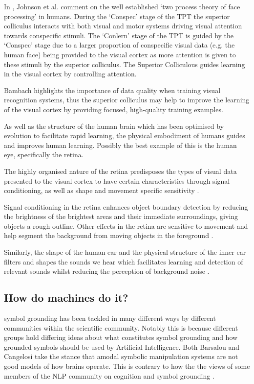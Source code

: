In \cite{johnson2015two}, Johnson et al. comment on the well established `two process theory of face processing' in humans.  During the `Conspec' stage of the \ac{TPT} the superior colliculus interacts with both visual and motor systems driving visual attention towards conspecific stimuli. The `Conlern' stage of the \ac{TPT} is guided by the `Conspec' stage due to a larger proportion of conspecific visual data  (e.g. the human face) being provided to the visual cortex as more attention is given to these stimuli by the superior colliculus. 
The Superior Colliculous guides learning in the visual cortex by controlling attention.

Bambach \cite{bambach2017egocentric} highlights the importance of data quality when training visual recognition systems, thus the superior colliculus may help to improve the learning of the visual cortex by providing focused, high-quality training examples.

As well as the structure of the human brain which has been optimised by evolution to facilitate rapid learning, the physical embodiment of humans guides and improves human learning. Possibly the best example of this is the human eye, specifically the retina.

The highly organised nature of the retina predisposes the types of visual data presented to the visual cortex to have certain characteristics through signal conditioning, as well as shape and movement specific sensitivity \cite{masland2012neuronal}.

Signal conditioning in the retina enhances object boundary detection by reducing the brightness of the brightest areas and their immediate surroundings, giving objects a rough outline. Other effects in the retina are sensitive to movement and help segment the background from moving objects in the foreground \cite{olveczky2003segregation}.

Similarly, the shape of the human ear and the physical structure of the inner ear filters and shapes the sounds we hear which facilitates learning and detection of relevant sounds whilst reducing the perception of background noise \cite{oxenham2018we}.

\subsection{How do machines do it?}
symbol grounding has been tackled in many different ways by different communities within the scientific community. Notably this is because different groups hold differing ideas about what constitutes symbol grounding and how grounded symbols should be used by Artificial Intelligence. Both Barsalou \cite{barsalou2008grounded} and Cangelosi \cite{cangelosi2000robotic} take the stance that amodal symbolic manipulation systems are not good models of how brains operate. This is contrary to how the the views of some members of the \ac{NLP} community on cognition and symbol grounding \cite{lemonlearning, yu2017learning}.

